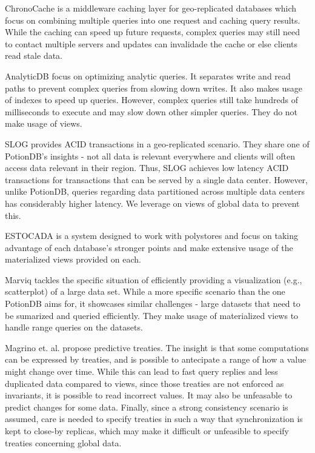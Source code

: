 \documentclass[sigconf, nonacm]{acmart}
\begin{document}
ChronoCache \cite{chronocache} is a middleware caching layer for geo-replicated databases which focus on combining multiple queries into one request and caching query results.
While the caching can speed up future requests, complex queries may still need to contact multiple servers and updates can invalidade the cache or else clients read stale data.

AnalyticDB \cite{analyticdb} focus on optimizing analytic queries. 
It separates write and read paths to prevent complex queries from slowing down writes. 
It also makes usage of indexes to speed up queries.
However, complex queries still take hundreds of milliseconds to execute and may slow down other simpler queries.
They do not make usage of views.

SLOG \cite{slog} provides ACID transactions in a geo-replicated scenario.
They share one of PotionDB's insights - not all data is relevant everywhere and clients will often access data relevant in their region.
Thus, SLOG achieves low latency ACID transactions for transactions that can be served by a single data center.
However, unlike PotionDB, queries regarding data partitioned across multiple data centers has considerably higher latency.
We leverage on views of global data to prevent this.

ESTOCADA \cite{estocada} is a system designed to work with polystores and focus on taking advantage of each database's stronger points and make extensive usage of the materialized views provided on each.

Marviq \cite{marviq} tackles the specific situation of efficiently providing a visualization (e.g., scatterplot) of a large data set.
While a more specific scenario than the one PotionDB aims for, it showcases similar challenges - large datasets that need to be sumarized and queried efficiently.
They make usage of materialized views to handle range queries on the datasets.

Magrino et. al. \cite{treaties} propose predictive treaties. 
The insight is that some computations can be expressed by treaties, and is possible to antecipate a range of how a value might change over time.
While this can lead to fast query replies and less duplicated data compared to views, since those treaties are not enforced as invariants, it is possible to read incorrect values.
It may also be unfeasable to predict changes for some data.
Finally, since a strong consistency scenario is assumed, care is needed to specify treaties in such a way that synchronization is kept to close-by replicas, which may make it difficult or unfeasible to specify treaties concerning global data.
\end{document}

